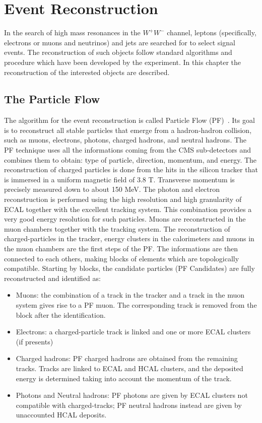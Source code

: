 \chapter{Event Reconstruction}

\label{cap4}
In the search of high mass resonances in the $W^+W^-$ channel, leptons (specifically, electrons or muons and neutrinos) and jets are searched for to select signal events.
The reconstruction of such objects follow standard algorithms and procedure which have been
developed by the experiment. In this chapter the reconstruction of the interested objects are described.

\section{The Particle Flow}
\label{PFt}
The algorithm for the event reconstruction is called Particle Flow (PF)~\cite{CMS-PAS-PFT-09-001}. Its goal is to reconstruct all stable particles that emerge from a hadron-hadron collision, such as muons, electrons, photons, charged hadrons, and neutral hadrons. The PF technique uses all the informations coming from the 
CMS sub-detectors and combines them to obtain: type of particle, direction, momentum, and energy.
The reconstruction of charged particles is done from the hits in the silicon tracker that is immersed in a uniform magnetic field of 3.8 T. 
Transverse momentum is precisely measured down to about 150 MeV.
The photon and electron reconstruction is performed using the high resolution and high granularity of ECAL together with the excellent tracking system. This combination provides a very good energy resolution for such particles. Muons are reconstructed in the muon chambers together with the tracking system.
The reconstruction of charged-particles in the tracker, energy clusters in the calorimeters and muons in the muon chambers are the first steps of the PF. The informations are then connected to each others, making blocks of elements which are topologically compatible.
Starting by blocks, the candidate particles (PF Candidates) are fully reconstructed and identified as:
\begin{itemize}
\item Muons: the combination of a track in the tracker and a track in the muon system gives rise to a PF muon. The corresponding track is removed from the block after the identification.
\item Electrons: a charged-particle track is linked and one or more ECAL clusters (if presents)
\item Charged hadrons: PF charged hadrons are obtained from the remaining tracks. Tracks 
are linked to ECAL and HCAL clusters, and the deposited energy is determined taking into
account the momentum of the track.
\item Photons and Neutral hadrons: PF photons are given by ECAL clusters not compatible with charged-tracks; PF
neutral hadrons instead are given by unaccounted HCAL deposits.
\end{itemize}
